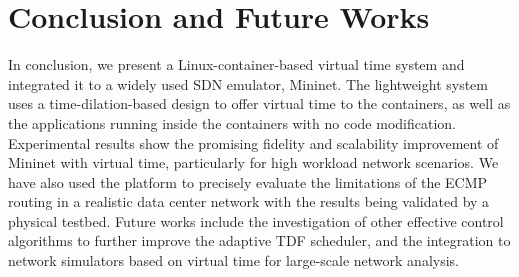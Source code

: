 \section{Conclusion and Future Works}
\label{Sec-Conclusion}
In conclusion, we present a Linux-container-based virtual time system and integrated it to a widely used SDN emulator, Mininet. The lightweight system uses a time-dilation-based design to offer virtual time to the containers, as well as the applications running inside the containers with no code modification. Experimental results show the promising fidelity and scalability improvement of Mininet with virtual time, particularly for high workload network scenarios. We have also used the platform to precisely evaluate the limitations of the ECMP routing in a realistic data center network with the results being validated by a physical testbed. Future works include the investigation of other effective control algorithms to further improve the adaptive TDF scheduler, and the integration to network simulators based on virtual time for large-scale network analysis.
